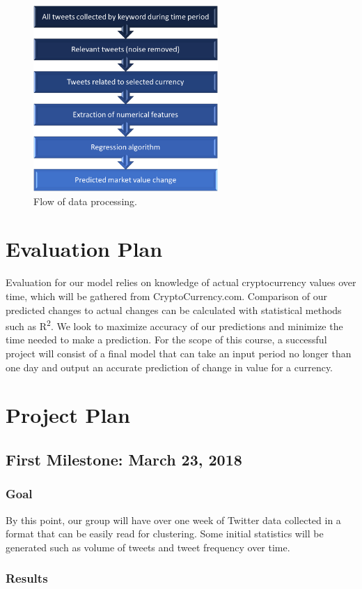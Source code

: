\documentclass[sigconf]{acmart}
\begin{document}
\begin{figure}[H]
\caption{Flow of data processing.}
\includegraphics[width=7cm]{chart.png}
\end{figure}


\section{Evaluation Plan}
Evaluation for our model relies on knowledge of actual cryptocurrency values over time, which will be gathered from CryptoCurrency.com. Comparison of our predicted changes to actual changes can be calculated with statistical methods such as R\textsuperscript{2}. We look to maximize accuracy of our predictions and minimize the time needed to make a prediction. For the scope of this course, a successful project will consist of a final model that can take an input period no longer than one day and output an accurate prediction of change in value for a currency.


\section{Project Plan}
\subsection{First Milestone: March 23, 2018}
\subsubsection{Goal}
By this point, our group will have over one week of Twitter data collected in a format that can be easily read for clustering. Some initial statistics will be generated such as volume of tweets and tweet frequency over time.

\subsubsection{Results}
\end{document}

